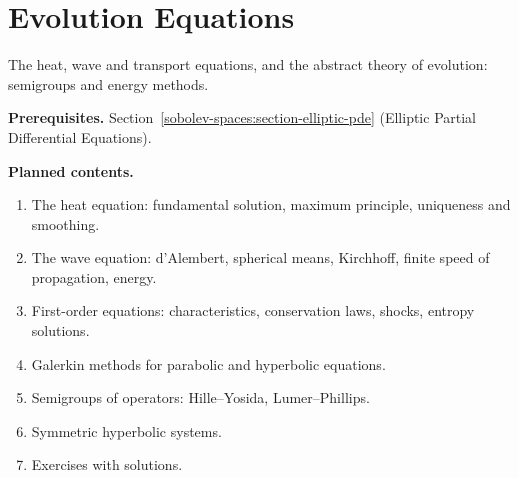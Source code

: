 \section{Evolution Equations}\label{sobolev-spaces:section-evolution-equations}
The heat, wave and transport equations, and the abstract theory of evolution: semigroups and energy
methods.

\noindent\textbf{Prerequisites.} Section~\ref{sobolev-spaces:section-elliptic-pde} (Elliptic Partial Differential Equations).

\noindent\textbf{Planned contents.}
\begin{enumerate}
\item The heat equation: fundamental solution, maximum principle, uniqueness and smoothing.
\item The wave equation: d'Alembert, spherical means, Kirchhoff, finite speed of propagation, energy.
\item First-order equations: characteristics, conservation laws, shocks, entropy solutions.
\item Galerkin methods for parabolic and hyperbolic equations.
\item Semigroups of operators: Hille--Yosida, Lumer--Phillips.
\item Symmetric hyperbolic systems.
\item Exercises with solutions.
\end{enumerate}
